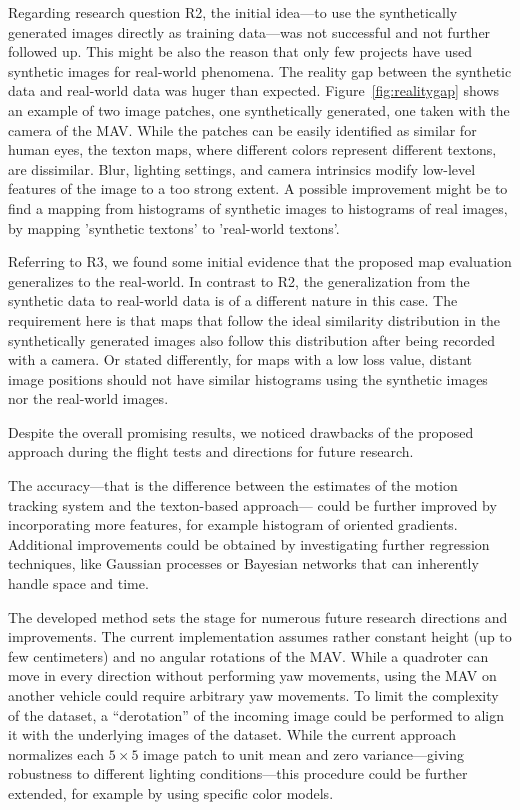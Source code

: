 \documentclass{report}
\begin{document}
Regarding research question R2, the initial idea---to use the
synthetically generated images directly as training data---was not
successful and not further followed up. This might be also the reason
that only few projects have used synthetic images for real-world
phenomena. The reality gap between the synthetic data and real-world
data was huger than expected. Figure~\ref{fig:realitygap} shows an
example of two image patches, one synthetically generated, one taken
with the camera of the MAV. While the patches can be easily identified
as similar for human eyes, the texton maps, where different colors
represent different textons, are dissimilar. Blur, lighting settings,
and camera intrinsics modify low-level features of the image to a too
strong extent. A possible improvement might be to find a mapping from
histograms of synthetic images to histograms of real images, by
mapping 'synthetic textons' to 'real-world textons'.

Referring to R3, we found some initial evidence that the proposed map
evaluation generalizes to the real-world. In contrast to R2, the
generalization from the synthetic data to real-world data is of a
different nature in this case. The requirement here is that maps that
follow the ideal similarity distribution in the synthetically
generated images also follow this distribution after being recorded
with a camera. Or stated differently, for maps with a low loss value,
distant image positions should not have similar histograms using the
synthetic images nor the real-world images.

Despite the overall promising results, we noticed drawbacks of the
proposed approach during the flight tests and directions for future
research.

The accuracy---that is the difference between the estimates of the
motion tracking system and the texton-based approach--- could be
further improved by incorporating more features, for example histogram
of oriented gradients. Additional improvements could be obtained by
investigating further regression techniques, like Gaussian processes
or Bayesian networks that can inherently handle space and time.

The developed method sets the stage for numerous future research
directions and improvements. The current implementation assumes rather
constant height (up to few centimeters) and no angular rotations of
the MAV. While a quadroter can move in every direction without
performing yaw movements, using the MAV on another vehicle could
require arbitrary yaw movements. To limit the complexity of the
dataset, a ``derotation'' of the incoming image could be performed to
align it with the underlying images of the dataset. While the current
approach normalizes each $5\times5$ image patch to unit mean and zero
variance---giving robustness to different lighting conditions---this
procedure could be further extended, for example by using specific
color models.
\end{document}
